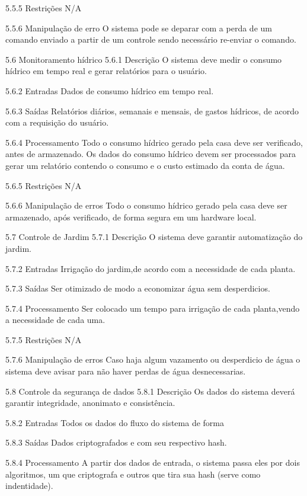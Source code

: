 5.5.5 Restrições
N/A

5.5.6 Manipulação de erro
    O sistema pode se deparar com a perda de um comando enviado a partir de um controle sendo necessário re-enviar o comando.



5.6 Monitoramento hídrico
5.6.1 Descrição
O sistema deve medir o consumo hídrico em tempo real e gerar relatórios para o usuário.

5.6.2 Entradas
Dados de consumo hídrico em tempo real.

5.6.3 Saídas
Relatórios diários, semanais e mensais, de gastos hídricos, de acordo com a requisição do usuário.

5.6.4 Processamento
Todo o consumo hídrico gerado pela casa deve ser verificado, antes de armazenado.
Os dados do consumo hídrico devem ser processados para gerar um relatório contendo o consumo e o custo estimado da conta de água.

5.6.5 Restrições
N/A

5.6.6 Manipulação de erros
Todo o consumo hídrico gerado pela casa deve ser armazenado, após verificado, de forma segura em um hardware local.




5.7 Controle de Jardim
5.7.1 Descrição
O sistema deve garantir automatização do jardim.

5.7.2 Entradas
Irrigação do jardim,de acordo com a necessidade de cada planta.

5.7.3 Saídas
Ser otimizado de modo a economizar água sem desperdicios.

5.7.4 Processamento
Ser colocado um tempo para irrigação de cada planta,vendo a necessidade de cada uma.

5.7.5 Restrições
N/A

5.7.6 Manipulação de erros
Caso haja algum vazamento ou desperdicio de água o sistema deve avisar para não haver perdas de água desnecessarias.






5.8 Controle da segurança de dados
5.8.1 Descrição
Os dados do sistema deverá garantir integridade, anonimato e consistência.

5.8.2 Entradas
    Todos os dados do fluxo do sistema de forma

5.8.3 Saídas
    Dados criptografados e com seu respectivo hash.

5.8.4 Processamento
    A partir dos dados de entrada, o sistema passa eles por dois algoritmos, um que criptografa e outros que tira sua hash (serve como indentidade).

